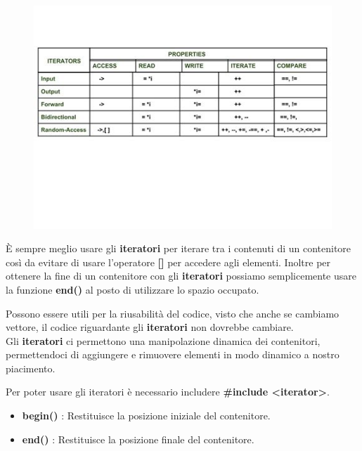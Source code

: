 \pagebreak

\begin{figure}[H]
	\centering
	\includegraphics[width=1.2\textwidth, height=1.2\textheight, keepaspectratio]{./imgs/iterators.jpg}
	\label{fig:iterators}
\end{figure}

\vspace{-3.69cm}

\textsf{\small È sempre meglio usare gli \textbf{iteratori} per iterare tra i contenuti di un contenitore così da evitare di usare l'operatore \textbf{[]} per accedere agli elementi. Inoltre per ottenere la fine di un contenitore con gli \textbf{iteratori} possiamo semplicemente usare la funzione \textbf{end()} al posto di utilizzare lo spazio occupato. } \break

\textsf{\small Possono essere utili per la riusabilità del codice, visto che anche se cambiamo vettore, il codice riguardante gli \textbf{iteratori} non dovrebbe cambiare.} \\

\textsf{\small Gli \textbf{iteratori} ci permettono una manipolazione dinamica dei contenitori, permettendoci di aggiungere e rimuovere elementi in modo dinamico a nostro piacimento.} \break

\textsf{\small Per poter usare gli iteratori è necessario includere \textbf{\#include <iterator>}.} \\

\begin{itemize}
	\item \textsf{\small \textbf{begin()} : Restituisce la posizione iniziale del contenitore.}
	\item \textsf{\small \textbf{end()} : Restituisce la posizione finale del contenitore.}
\end{itemize}

